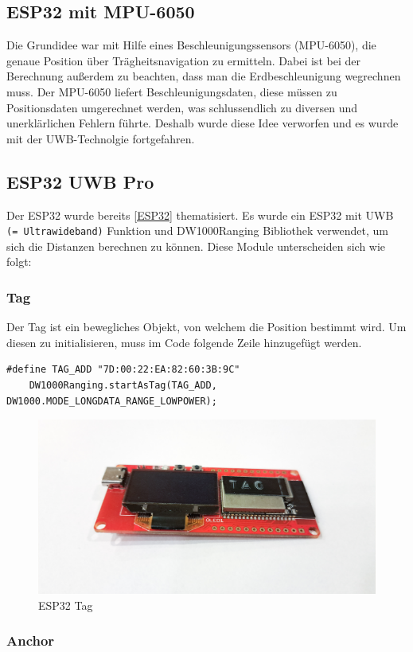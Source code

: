\subsection{ESP32 mit MPU-6050}
Die Grundidee war mit Hilfe eines Beschleunigungssensors (MPU-6050), die genaue Position über Trägheitsnavigation zu ermitteln. Dabei ist bei der Berechnung außerdem zu beachten, dass man die Erdbeschleunigung wegrechnen muss. Der MPU-6050 liefert Beschleunigungsdaten, diese müssen zu Positionsdaten umgerechnet werden, was schlussendlich zu diversen und unerklärlichen Fehlern führte. Deshalb wurde diese Idee verworfen und es wurde mit der UWB-Technolgie fortgefahren. \parencite{MPU6050}

\subsection{ESP32 UWB Pro}

Der ESP32 wurde bereits \ref{ESP32} thematisiert. Es wurde ein ESP32 mit UWB \texttt{(= Ultrawideband)} Funktion und DW1000Ranging Bibliothek verwendet, um sich die Distanzen berechnen zu können. Diese Module unterscheiden sich wie folgt:

\subsubsection{Tag}
Der Tag ist ein bewegliches Objekt, von welchem die Position bestimmt wird. Um diesen zu initialisieren, muss im Code folgende Zeile hinzugefügt werden.
\begin{lstlisting}[style=C++, caption=Tag Initialisierung, captionpos=b]
	#define TAG_ADD "7D:00:22:EA:82:60:3B:9C"
	DW1000Ranging.startAsTag(TAG_ADD, DW1000.MODE_LONGDATA_RANGE_LOWPOWER);
\end{lstlisting}

\begin{figure}[H]
	\centering
	\includegraphics[width=0.5\linewidth]{images/Tag.jpg}
	\caption[ESP32 Tag]{ESP32 Tag}
	\label{fig:ESP32-Tag}
\end{figure}

\newpage
\subsubsection{Anchor}

